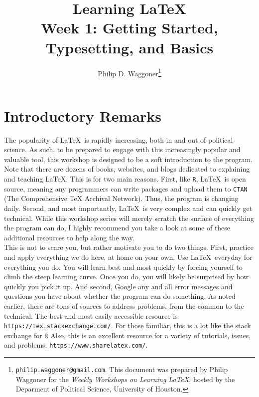 \documentclass[11pt]{article}
\newcommand{\forceindent}{\leavevmode{\parindent=1.5em\indent}} %
\begin{document}
	
	\title{Learning \LaTeX \\
		\vspace{1cm}
	\large Week 1: Getting Started, Typesetting, and Basics \\
		\vspace{1cm}}
	\author{Philip D. Waggoner\footnote{{\texttt{philip.waggoner@gmail.com}}. This document was prepared by Philip Waggoner for the \textit{Weekly Workshops on Learning \LaTeX}, hosted by the Deparment of Political Science, University of Houston.}}
	\date{ } %
	\maketitle

\newpage

\tableofcontents

\newpage

\section{Introductory Remarks}
	
	\forceindent The popularity of \LaTeX\ is rapidly increasing, both in and out of political science. As such, to be prepared to engage with this increasingly popular and valuable tool, this workshop is designed to be a soft introduction to the program. Note that there are dozens of books, websites, and blogs dedicated to explaining and teaching \LaTeX. This is for two main reasons. First, like \texttt{R}, \LaTeX\ is open source, meaning any programmers can write packages and upload them to \texttt{CTAN} (The Comprehensive TeX Archival Network). Thus, the program is changing daily. Second, and most importantly, \LaTeX\ is very complex and can quickly get technical. While this workshop series will merely scratch the surface of everything the program can do, I highly recommend you take a look at some of these additional resources to help along the way. \\

	This is not to scare you, but rather motivate you to do two things. First, practice and apply everything we do here, at home on your own. Use \LaTeX\ everyday for everything you do. You will learn best and most quickly by forcing yourself to climb the steep learning curve. Once you do, you will likely be surprised by how quickly you pick it up. And second, Google any and all error messages and questions you have about whether the program can do something. As noted earlier, there are tons of sources to address problems, from the common to the technical. The best and most easily accessible resource is \texttt{https://tex.stackexchange.com/}. For those familiar, this is a lot like the stack exchange for \texttt{R} Also, this is an excellent resource for a variety of tutorials, issues, and problems: \texttt{https://www.sharelatex.com/}. \\
\end{document}
